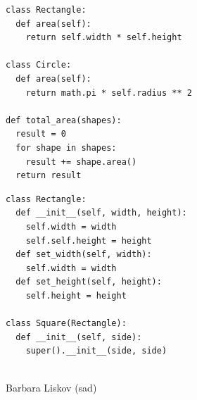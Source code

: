 \documentclass[calcdimensions,landscape,letterpaper]{powersem}
\newcommand{\thecurrentheading}{}
\newcommand{\heading}[1]{\renewcommand{\thecurrentheading}{#1}}
\begin{document}
\begin{slide}
  \heading{Open-Closed - After}
  \begin{center}
    \begin{verbatim}
class Rectangle:
  def area(self):
    return self.width * self.height

class Circle:
  def area(self):
    return math.pi * self.radius ** 2

def total_area(shapes):
  result = 0
  for shape in shapes:
    result += shape.area()
  return result
    \end{verbatim}
  \end{center}
\end{slide}

\begin{slide}
  \heading{Liskov-Substitution - Before}
  \begin{center}
    \begin{minipage}[b]{.6\textwidth}
      \begin{verbatim}
class Rectangle:
  def __init__(self, width, height):
    self.width = width
    self.self.height = height
  def set_width(self, width):
    self.width = width
  def set_height(self, height):
    self.height = height

class Square(Rectangle):
  def __init__(self, side):
    super().__init__(side, side)
      \end{verbatim}
    \end{minipage}
    \begin{minipage}[b]{.35\textwidth}
      \begin{center}
        \\
        Barbara Liskov (sad)
      \end{center}
    \end{minipage}
  \end{center}
\end{slide}
\end{document}
